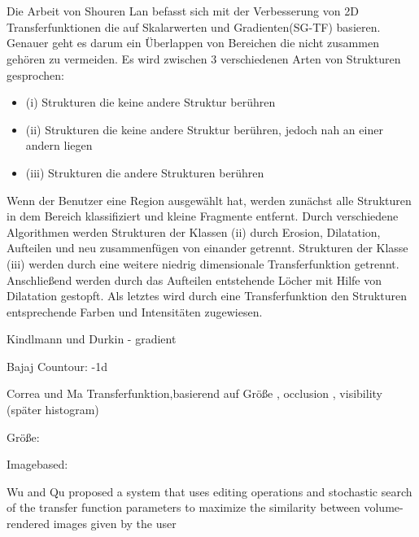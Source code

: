 \chapter{}
\label{sec:state_of_the_art}



Die Arbeit von Shouren Lan \cite{lan2017improving} befasst sich mit der Verbesserung von 2D Transferfunktionen die auf Skalarwerten und Gradienten(SG-TF) basieren. Genauer geht es darum ein Überlappen von Bereichen die nicht zusammen gehören zu vermeiden.
\newline
Es wird zwischen 3 verschiedenen Arten von Strukturen gesprochen:
\begin{itemize}
\item (i) Strukturen die keine andere Struktur berühren
\item (ii) Strukturen die keine andere Struktur berühren, jedoch nah an einer andern liegen
\item (iii) Strukturen die andere Strukturen berühren
\end{itemize} 
Wenn der Benutzer eine Region ausgewählt hat, werden zunächst alle Strukturen in dem Bereich klassifiziert und kleine Fragmente entfernt. Durch verschiedene Algorithmen werden Strukturen der Klassen (ii) durch Erosion, Dilatation, Aufteilen und neu zusammenfügen von einander getrennt. Strukturen der Klasse (iii) werden durch eine weitere niedrig dimensionale Transferfunktion getrennt. Anschließend werden durch das Aufteilen entstehende Löcher mit Hilfe von Dilatation gestopft. Als letztes wird durch eine Transferfunktion den Strukturen entsprechende Farben und Intensitäten zugewiesen.





Kindlmann und Durkin  \cite{kindlmann1998semi} - gradient


Bajaj Countour: \cite{bajaj1997contour} -1d


Correa und Ma Transferfunktion,basierend auf Größe \cite{correa2008size}, occlusion \cite{correa2009occlusion}, visibility \cite{correa2009visibility}(später histogram\cite{correa2011visibility})


Größe: 





Imagebased:

 
Wu and Qu
proposed a system that uses editing operations and stochastic
search of the transfer function parameters to maximize the
similarity between volume-rendered images given by the user

